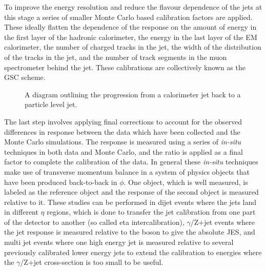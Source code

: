 To improve the energy resolution and reduce the flavour dependence of the jets at this stage a series of smaller Monte Carlo based calibration factors are applied.  
These ideally flatten the dependence of the response on the amount of energy in the first layer of the hadronic calorimeter, the energy in the last layer of the EM calorimeter, the number of charged tracks in the jet, the width of the distribution of the tracks in the jet, and the number of track segments in the muon spectrometer behind the jet.  
These calibrations are collectively known as the \gls{GSC} scheme.  

\begin{figure}[!ht]
  \begin{center}
  \end{center}
  \caption[Jet calibration sequence used by ATLAS.]
      {\small A diagram outlining the progression from a calorimeter jet back to a particle level jet.  }
  \label{Fig:JetCalibSequenceFig}
\end{figure}


The last step involves applying final corrections to account for the observed differences in response between the data which have been collected and the Monte Carlo simulations.  
The response is measured using a series of \textit{in-situ} techniques in both data and Monte Carlo, and the ratio is applied as a final factor to complete the calibration of the data.  
In general these \textit{in-situ} techniques make use of transverse momentum balance in a system of physics objects that have been produced back-to-back in $\phi$.  
One object, which is well measured, is labeled as the reference object and the response of the second object is measured relative to it.  
These studies can be performed in dijet events where the jets land in different $\eta$ regions, which is done to transfer the jet calibration from one part of the detector to another (so called eta intercalibration), $\gamma$/Z+jet events where the jet response is measured relative to the boson to give the absolute JES, and multi jet events where one high energy jet is measured relative to several previously calibrated lower energy jets to extend the calibration to energies where the $\gamma$/Z+jet cross-section is too small to be useful.  

